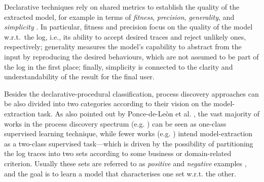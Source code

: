 Declarative techniques rely on shared metrics to establish the quality of the extracted model, for example in terms of \emph{fitness}, \emph{precision}, \emph{generality}, and \emph{simplicity} \cite{2015-Adriansyah,2014-Broucke,2018-Ponce}. In particular, fitness and precision focus on the quality of the model w.r.t.~the log, i.e., its ability to accept desired traces and reject unlikely ones, respectively; generality measures the model's capability to abstract from the input by reproducing the desired behaviours, which are not assumed to be part of the log in the first place; finally, simplicity is connected to the clarity and understandability of the result for the final user. 

Besides the declarative-procedural classification, process discovery approaches can be also divided into two categories according to their vision on the model-extraction task. 
As also pointed out by Ponce-de-Le\`on et al. \cite{2018-Ponce}, the vast majority of works in the process discovery spectrum (e.g. \cite{2004-Aalst,2003-Weijters,2007-Gunther,2010-Aalst}) can be seen as one-class supervised learning technique, while fewer works (e.g. \cite{2006-Maruster,2009-Goedertier,2009-Chesani}) intend model-extraction as a two-class supervised task---which is driven by the possibility of partitioning the log traces into two sets according to some business or domain-related criterion. Usually these sets are referred to as \emph{positive} and \emph{negative} examples \cite{2018-Ponce}, and the goal is to learn a model that characterises one set w.r.t. the other.

